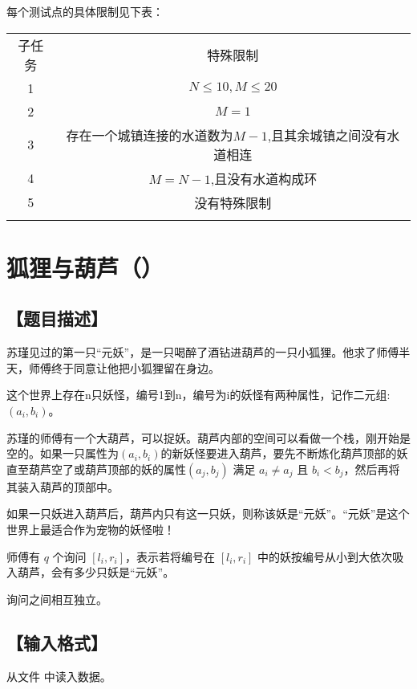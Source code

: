 \documentclass{statement}
\begin{document}
    每个测试点的具体限制见下表：
    \begin{center}
        \begin{tabular}{|c|c|}
            \Xhline{5\arrayrulewidth}
            子任务 & 特殊限制\\
            \Xhline{3\arrayrulewidth}
            1 & $N \le 10,M \le 20$\\
            \hline
            2 & $ M = 1$\\
            \hline
            3 & 存在一个城镇连接的水道数为$M-1$,且其余城镇之间没有水道相连\\
            \hline
            4 & $M = N-1$,且没有水道构成环\\
            \hline           
            5 & 没有特殊限制\\
            \Xhline{5\arrayrulewidth}
        \end{tabular}
    \end{center}



    \newpage
    \section{狐狸与葫芦（）}
    \subsection[题目描述]{【题目描述】}

	苏瑾见过的第一只“元妖”，是一只喝醉了酒钻进葫芦的一只小狐狸。他求了师傅半天，师傅终于同意让他把小狐狸留在身边。
	
	这个世界上存在n只妖怪，编号1到n，编号为i的妖怪有两种属性，记作二元组:$(a_i,b_i)$。
	
	苏瑾的师傅有一个大葫芦，可以捉妖。葫芦内部的空间可以看做一个栈，刚开始是空的。如果一只属性为$(a_i,b_i)$的新妖怪要进入葫芦，要先不断炼化葫芦顶部的妖直至葫芦空了或葫芦顶部的妖的属性$(a_j,b_j)$ 满足 $a_i \neq a_j$ 且 $b_i < b_j$，然后再将其装入葫芦的顶部中。
	
	如果一只妖进入葫芦后，葫芦内只有这一只妖，则称该妖是“元妖”。“元妖”是这个世界上最适合作为宠物的妖怪啦！
	
	师傅有 $q$ 个询问 $[l_i, r_i]$，表示若将编号在 $[l_i, r_i]$ 中的妖按编号从小到大依次吸入葫芦，会有多少只妖是“元妖”。
	
	询问之间相互独立。

    \subsection[输入格式]{【输入格式】}
    从文件  中读入数据。
\end{document}
